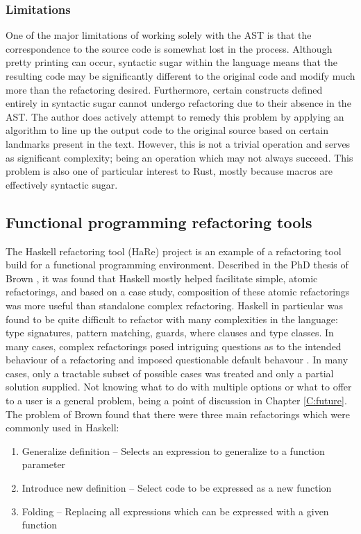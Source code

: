 \subsubsection{Limitations}
One of the major limitations of working solely with the AST is that the correspondence to the source code is somewhat lost in the process. Although pretty printing can occur, syntactic sugar within the language means that the resulting code may be significantly different to the original code and modify much more than the refactoring desired. Furthermore, certain constructs defined entirely in syntactic sugar cannot undergo refactoring due to their absence in the AST. The author does actively attempt to remedy this problem by applying an algorithm to line up the output code to the original source based on certain landmarks present in the text. However, this is not a trivial operation and serves as significant complexity; being an operation which may not always succeed. This problem is also one of particular interest to Rust, mostly because macros are effectively syntactic sugar.

\subsection{Functional programming refactoring tools}
The Haskell refactoring tool (HaRe) project is an example of a refactoring tool build for a functional programming environment. Described in the PhD thesis of Brown \cite{brown2008tool}, it was found that Haskell mostly helped facilitate simple, atomic refactorings, and based on a case study, composition of these atomic refactorings was more useful than standalone complex refactoring. Haskell in particular was found to be quite difficult to refactor with many complexities in the language: type signatures, pattern matching, guards, where clauses and type classes. In many cases, complex refactorings posed intriguing questions as to the intended behaviour of a refactoring and imposed questionable default behavour \cite{sculthorpe}. In many cases, only a tractable subset of possible cases was treated and only a partial solution supplied. Not knowing what to do with multiple options or what to offer to a user is a general problem, being a point of discussion in Chapter \ref{C:future}. The problem of Brown found that there were three main refactorings which were commonly used in Haskell: 

\begin{enumerate}
\item Generalize definition -- Selects an expression to generalize to a function parameter
\item Introduce new definition -- Select code to be expressed as a new function
\item Folding -- Replacing all expressions which can be expressed with a given function
\end{enumerate}

